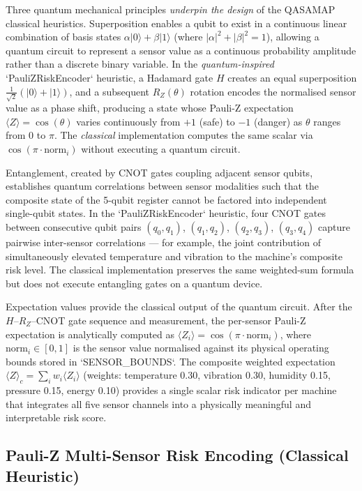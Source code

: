 Three quantum mechanical principles \emph{underpin the design} of the QASAMAP classical heuristics. Superposition enables a qubit to exist in a continuous linear combination of basis states $\alpha|0\rangle + \beta|1\rangle$ (where $|\alpha|^2 + |\beta|^2 = 1$), allowing a quantum circuit to represent a sensor value as a continuous probability amplitude rather than a discrete binary variable. In the \emph{quantum-inspired} `PauliZRiskEncoder` heuristic, a Hadamard gate $H$ creates an equal superposition $\frac{1}{\sqrt{2}}(|0\rangle + |1\rangle)$, and a subsequent $R_Z(\theta)$ rotation encodes the normalised sensor value as a phase shift, producing a state whose Pauli-Z expectation $\langle Z \rangle = \cos(\theta)$ varies continuously from $+1$ (safe) to $-1$ (danger) as $\theta$ ranges from $0$ to $\pi$. The \emph{classical} implementation computes the same scalar via $\cos(\pi \cdot \text{norm}_i)$ without executing a quantum circuit.

Entanglement, created by CNOT gates coupling adjacent sensor qubits, establishes quantum correlations between sensor modalities such that the composite state of the 5-qubit register cannot be factored into independent single-qubit states. In the `PauliZRiskEncoder` heuristic, four CNOT gates between consecutive qubit pairs $(q_0, q_1)$, $(q_1, q_2)$, $(q_2, q_3)$, $(q_3, q_4)$ capture pairwise inter-sensor correlations --- for example, the joint contribution of simultaneously elevated temperature and vibration to the machine's composite risk level. The classical implementation preserves the same weighted-sum formula but does not execute entangling gates on a quantum device.

Expectation values provide the classical output of the quantum circuit. After the $H$--$R_Z$--CNOT gate sequence and measurement, the per-sensor Pauli-Z expectation is analytically computed as $\langle Z_i \rangle = \cos(\pi \cdot \mathrm{norm}_i)$, where $\mathrm{norm}_i \in [0,1]$ is the sensor value normalised against its physical operating bounds stored in `SENSOR_BOUNDS`. The composite weighted expectation $\langle Z \rangle_c = \sum_i w_i \langle Z_i \rangle$ (weights: temperature 0.30, vibration 0.30, humidity 0.15, pressure 0.15, energy 0.10) provides a single scalar risk indicator per machine that integrates all five sensor channels into a physically meaningful and interpretable risk score.

\subsection{Pauli-Z Multi-Sensor Risk Encoding (Classical Heuristic)}

